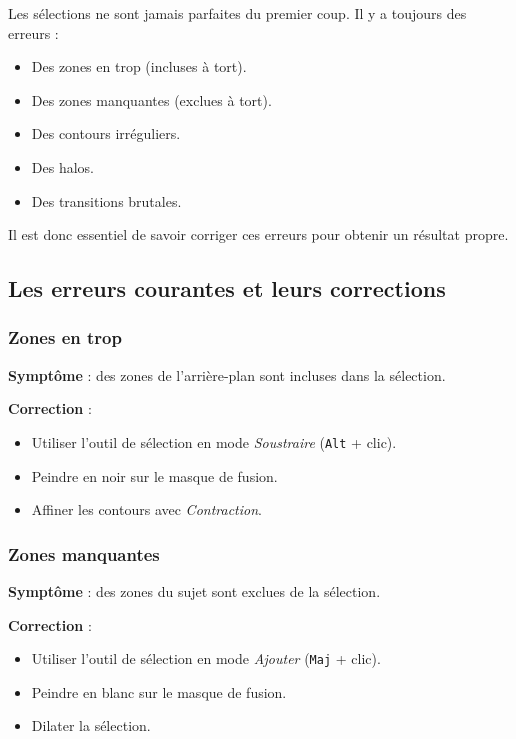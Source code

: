 Les sélections ne sont jamais parfaites du premier coup. Il y a toujours des erreurs :

\begin{itemize}
    \item Des zones en trop (incluses à tort).
    \item Des zones manquantes (exclues à tort).
    \item Des contours irréguliers.
    \item Des halos.
    \item Des transitions brutales.
\end{itemize}

Il est donc essentiel de savoir corriger ces erreurs pour obtenir un résultat propre.

\subsection{Les erreurs courantes et leurs corrections}

\subsubsection{Zones en trop}

\textbf{Symptôme} : des zones de l'arrière-plan sont incluses dans la sélection.

\textbf{Correction} :
\begin{itemize}
    \item Utiliser l'outil de sélection en mode \emph{Soustraire} (\texttt{Alt} + clic).
    \item Peindre en noir sur le masque de fusion.
    \item Affiner les contours avec \emph{Contraction}.
\end{itemize}

\subsubsection{Zones manquantes}

\textbf{Symptôme} : des zones du sujet sont exclues de la sélection.

\textbf{Correction} :
\begin{itemize}
    \item Utiliser l'outil de sélection en mode \emph{Ajouter} (\texttt{Maj} + clic).
    \item Peindre en blanc sur le masque de fusion.
    \item Dilater la sélection.
\end{itemize}


